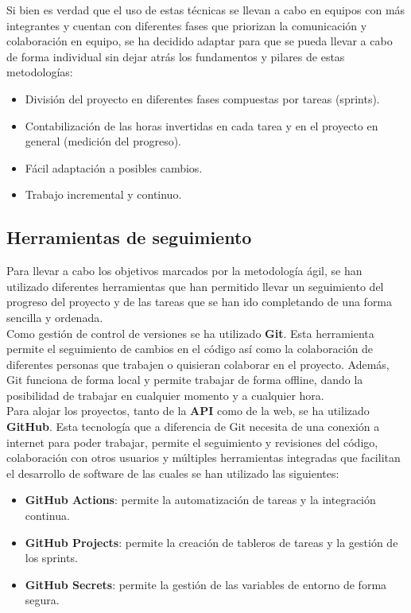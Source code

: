 Si bien es verdad que el uso de estas técnicas se llevan a cabo en equipos con más integrantes y cuentan con
diferentes fases que priorizan la comunicación y colaboración en equipo, se ha decidido adaptar para que se pueda
llevar a cabo de forma individual sin dejar atrás los fundamentos y pilares de estas metodologías:

\begin{itemize}
    \item División del proyecto en diferentes fases compuestas por tareas (sprints).
    \item Contabilización de las horas invertidas en cada tarea y en el proyecto en general (medición del progreso).
    \item Fácil adaptación a posibles cambios.
    \item Trabajo incremental y continuo.
\end{itemize}

\subsection{Herramientas de seguimiento}\label{subsec:herramientas-de-seguimiento}

Para llevar a cabo los objetivos marcados por la metodología ágil, se han utilizado diferentes herramientas que
han permitido llevar un seguimiento del progreso del proyecto y de las tareas que se han ido completando
de una forma sencilla y ordenada. \\

Como gestión de control de versiones se ha utilizado \textbf{Git}. Esta herramienta permite el seguimiento de
cambios en el código así como la colaboración de diferentes personas que trabajen o quisieran colaborar en el
proyecto. Además, Git funciona de forma local y permite trabajar de forma offline, dando la posibilidad de
trabajar en cualquier momento y a cualquier hora. \\

Para alojar los proyectos, tanto de la \textbf{API} como de la web, se ha utilizado \textbf{GitHub}. Esta tecnología que
a diferencia de Git necesita de una conexión a internet para poder trabajar, permite el seguimiento y revisiones del
código, colaboración con otros usuarios y múltiples herramientas integradas que facilitan el desarrollo de software de
las cuales se han utilizado las siguientes:

\begin{itemize}
    \item \textbf{GitHub Actions}: permite la automatización de tareas y la integración continua.
    \item \textbf{GitHub Projects}: permite la creación de tableros de tareas y la gestión de los sprints.
    \item \textbf{GitHub Secrets}: permite la gestión de las variables de entorno de forma segura.
\end{itemize}

